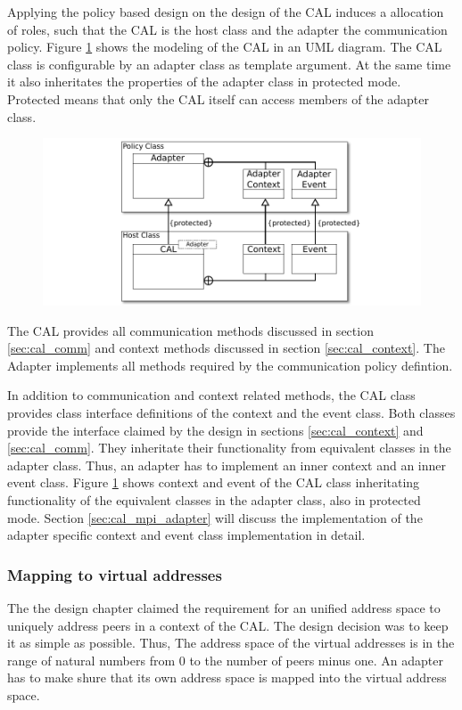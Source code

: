 Applying the policy based design on the design of the CAL
induces a allocation of roles, such that the CAL is the host class and
the adapter the communication policy. Figure \ref{fig:cal_uml} shows
the modeling of the CAL in an UML diagram. The CAL class is configurable by
an adapter class as template argument. At the same time it also inheritates
the properties of the adapter class in protected mode. Protected means
that only the CAL itself can access members of the adapter class.

\begin{figure}[H]
  \centering \includegraphics[width=\textwidth]{graphics/40_cal_uml}
  \caption{ }
  \label{fig:cal_uml}
\end{figure}

The CAL provides all communication methods discussed in section
\ref{sec:cal_comm} and context methods discussed in section
\ref{sec:cal_context}. The Adapter implements all methods
required by the communication policy defintion.


In addition to communication and context related methods, the CAL
class provides class interface definitions of the context and the
event class. Both classes provide the interface claimed by the design
in sections \ref{sec:cal_context} and \ref{sec:cal_comm}. They
inheritate their functionality from equivalent classes in the adapter
class. Thus, an adapter has to implement an inner context and an inner
event class.  Figure \ref{fig:cal_uml} shows context and event of the
CAL class inheritating functionality of the equivalent classes in the
adapter class, also in protected mode. Section
\ref{sec:cal_mpi_adapter} will discuss the implementation of the
adapter specific context and event class implementation in detail.

\subsubsection{Mapping to virtual addresses}
The the design chapter claimed the requirement for an unified address
space to uniquely address peers in a context of the CAL. The design decision
was to keep it as simple as possible. Thus, The address space of the
virtual addresses is in the range of natural numbers from 0 to the number
of peers minus one. An adapter has to make shure that its own address
space is mapped into the virtual address space.

